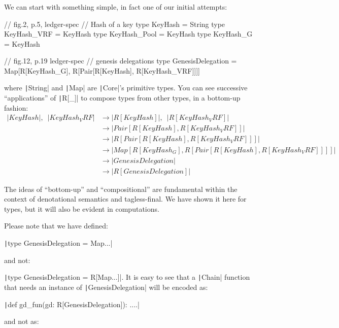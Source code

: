 \documentclass[11pt]{article}
\newcommand{\ScalaI}[1]{\texttt|#1|}
\begin{document}
\subsubsection*{\fbox{\ScalaI{GenesisDelegation}}}

We can start with something simple, in fact one of our initial attempts:

\begin{ScalaBlockSimple}
  // fig.2, p.5, ledger-spec
  // Hash of a key
  type KeyHash = String
  type KeyHash_VRF  = KeyHash
  type KeyHash_Pool = KeyHash
  type KeyHash_G    = KeyHash
  
  // fig.12, p.19 ledger-spec
  // genesis delegations
  type GenesisDelegation =
    Map[R[KeyHash_G], R[Pair[R[KeyHash], R[KeyHash_VRF]]]]
\end{ScalaBlockSimple}

\noindent where \ScalaI{String} and \ScalaI{Map} are \ScalaI{Core}'s primitive types. You can see successive ``applications'' of \ScalaI{R[_]} to compose types from other types, in a bottom-up fashion:
\begin{align*}
\ScalaI{KeyHash}, \enspace \ScalaI{KeyHash_VRF} 
  & \to \ScalaI{R[KeyHash]}, \enspace \ScalaI{R[KeyHash_VRF]} \\
  & \to \ScalaI{Pair[R[KeyHash], R[KeyHash_VRF]]} \\ 
  & \to \ScalaI{R[Pair[R[KeyHash], R[KeyHash_VRF]]]} \\ 
  & \to \ScalaI{Map[R[KeyHash_G], R[Pair[R[KeyHash], R[KeyHash_VRF]]]]} \\
  & \to \ScalaI{GenesisDelegation} \\
  & \to \ScalaI{R[GenesisDelegation]}
\end{align*}

\noindent The ideas of ``bottom-up'' and ``compositional'' are fundamental within the context of denotational semantics and tagless-final. We have shown it here for types, but it will also be evident in computations.

Please note that we have defined:

\ScalaI{type GenesisDelegation = Map...}

\noindent and not:

\ScalaI{type GenesisDelegation = R[Map...]}. It is easy to see that a \ScalaI{Chain} function that needs an instance of \ScalaI{GenesisDelegation} will be encoded as:

\ScalaI{def gd_fun(gd: R[GenesisDelegation]): ....}

\noindent and not as:
\end{document}
